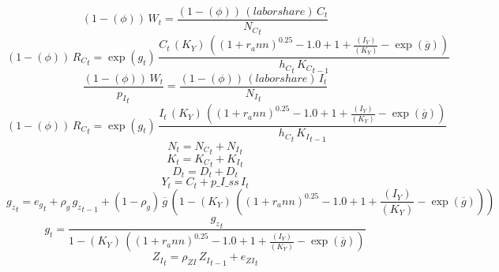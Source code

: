 \begin{dmath}
\left(1-{(\phi)}\right)\, {{W}}_{t}=\frac{\left(1-{(\phi)}\right)\, {(labor share)}\, {{C}}_{t}}{{{N_C}}_{t}}
\end{dmath}
\begin{dmath}
\left(1-{(\phi)}\right)\, {{R_C}}_{t}=\exp\left({{g}}_{t}\right)\, \frac{{{C}}_{t}\, {(K_Y)}\, \left(\left(1+{{r_ann}}\right)^{0.25}-1.0+1+\frac{{(I_Y)}}{{(K_Y)}}-\exp\left({{\overline{g}}}\right)\right)}{{{h_C}}_{t}\, {{K_C}}_{t-1}}
\end{dmath}
\begin{dmath}
\frac{\left(1-{(\phi)}\right)\, {{W}}_{t}}{{{p_I}}_{t}}=\frac{\left(1-{(\phi)}\right)\, {(labor share)}\, {{I}}_{t}}{{{N_I}}_{t}}
\end{dmath}
\begin{dmath}
\left(1-{(\phi)}\right)\, {{R_C}}_{t}=\exp\left({{g}}_{t}\right)\, \frac{{{I}}_{t}\, {(K_Y)}\, \left(\left(1+{{r_ann}}\right)^{0.25}-1.0+1+\frac{{(I_Y)}}{{(K_Y)}}-\exp\left({{\overline{g}}}\right)\right)}{{{h_C}}_{t}\, {{K_I}}_{t-1}}
\end{dmath}
\begin{dmath}
{{N}}_{t}={{N_C}}_{t}+{{N_I}}_{t}
\end{dmath}
\begin{dmath}
{{K}}_{t}={{K_C}}_{t}+{{K_I}}_{t}
\end{dmath}
\begin{dmath}
{{D}}_{t}={{D}}_{t}+{{D}}_{t}
\end{dmath}
\begin{dmath}
{{Y}}_{t}={{C}}_{t}+{p\_I\_ss}\, {{I}}_{t}
\end{dmath}
\begin{dmath}
{{g_z}}_{t}={{e_g}}_{t}+{{\rho_g}}\, {{g_z}}_{t-1}+\left(1-{{\rho_g}}\right)\, {{\overline{g}}}\, \left(1-{(K_Y)}\, \left(\left(1+{{r_ann}}\right)^{0.25}-1.0+1+\frac{{(I_Y)}}{{(K_Y)}}-\exp\left({{\overline{g}}}\right)\right)\right)
\end{dmath}
\begin{dmath}
{{g}}_{t}=\frac{{{g_z}}_{t}}{1-{(K_Y)}\, \left(\left(1+{{r_ann}}\right)^{0.25}-1.0+1+\frac{{(I_Y)}}{{(K_Y)}}-\exp\left({{\overline{g}}}\right)\right)}
\end{dmath}
\begin{dmath}
{{Z_I}}_{t}={{\rho_{ZI}}}\, {{Z_I}}_{t-1}+{{e_{ZI}}}_{t}
\end{dmath}
